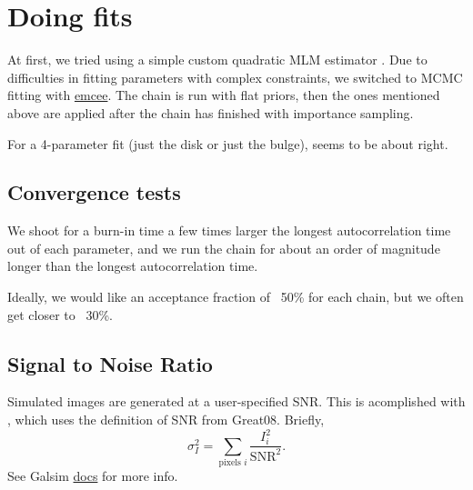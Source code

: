 \documentclass{article}
\begin{document}
\section{Doing fits}
At first, we tried using a simple custom quadratic MLM estimator
.  Due to difficulties in
fitting parameters with complex constraints, we switched to MCMC
fitting with \href{http://dan.iel.fm/emcee/current/}{emcee}.  The
chain is run with flat priors, then the ones mentioned above are
applied after the chain has finished with importance sampling.

For a 4-parameter fit (just the disk or just the bulge),  seems to be about right.

\subsection{Convergence tests}
We shoot for a burn-in time a few times larger the longest
autocorrelation time out of each parameter, and we run the chain for
about an order of magnitude longer than the longest autocorrelation
time.

Ideally, we would like an acceptance fraction of ~50\% for each chain, but
we often get closer to ~30\%.

\subsection{Signal to Noise Ratio}
Simulated images are generated at a user-specified SNR.  This is
acomplished with , which uses the
definition of SNR from Great08.  Briefly,
\[
\sigma_I^2 = \sum_{\textrm{pixels } i}\frac{I_i^2}{\textrm{SNR}^2}.
\]
See Galsim
\href{http://galsim-developers.github.io/GalSim/namespacegalsim_1_1noise.html#a86f91278331ac9c134c25b16d4c67a32}{docs}
for more info.
\end{document}
